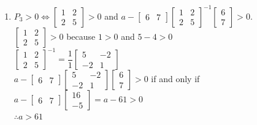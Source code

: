\documentclass[letterpaper]{article}
\begin{document}
\begin{enumerate}
\item  $P_3>0 \Leftrightarrow \left[\begin{array}{rr} 1 & 2\\ 2 & 5\end{array} \right]>0$ and $a-\left[\begin{array}{rr} 6&7\end{array}\right]\left[\begin{array}{rr} 1 & 2\\ 2 & 5\end{array} \right]^{-1}\left[\begin{array}{r} 6 \\7\end{array} \right]>0$. \\[2ex]
$\left[\begin{array}{rr} 1 & 2\\ 2 & 5\end{array} \right]>0$ because $1>0$ and $5-4>0$ \\[2ex]
$\left[\begin{array}{rr} 1 & 2\\ 2 & 5\end{array} \right]^{-1}=\dfrac{1}{1}\left[\begin{array}{rr} 5 & -2\\ -2 & 1\end{array} \right]$ \\[2ex]
$a-\left[\begin{array}{rr} 6&7\end{array}\right]\left[\begin{array}{rr} 5 & -2\\ -2 & 1\end{array} \right]\left[\begin{array}{r} 6 \\7\end{array} \right]>0$ if and only if $a-\left[\begin{array}{rr} 6&7\end{array}\right]\left[\begin{array}{r} 16 \\-5\end{array} \right]=a-61>0$ \\[2ex]
$\therefore \boxed{a>61}$
\end{enumerate}
\bigskip
\end{document}
